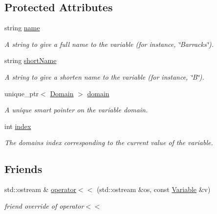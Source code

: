 \subsection*{Protected Attributes}
\begin{DoxyCompactItemize}
\item 
string \hyperlink{classghost_1_1Variable_a05cf4a4cd3a5c033028e0b0f11d1dafd}{name}
\begin{DoxyCompactList}\small\item\em A string to give a full name to the variable (for instance, \char`\"{}\+Barracks\char`\"{}). \end{DoxyCompactList}\item 
string \hyperlink{classghost_1_1Variable_afb5eb79a7f6351b4305fe082699b6d7d}{short\+Name}
\begin{DoxyCompactList}\small\item\em A string to give a shorten name to the variable (for instance, \char`\"{}\+B\char`\"{}). \end{DoxyCompactList}\item 
unique\+\_\+ptr$<$ \hyperlink{classghost_1_1Domain}{Domain} $>$ \hyperlink{classghost_1_1Variable_a9dbda868fa47e4353f30461e89ff8020}{domain}
\begin{DoxyCompactList}\small\item\em A unique smart pointer on the variable domain. \end{DoxyCompactList}\item 
int \hyperlink{classghost_1_1Variable_a934efa463fb1897b4266040e321dbc41}{index}
\begin{DoxyCompactList}\small\item\em The domain\textquotesingle{}s index corresponding to the current value of the variable. \end{DoxyCompactList}\end{DoxyCompactItemize}
\subsection*{Friends}
\begin{DoxyCompactItemize}
\item 
std\+::ostream \& \hyperlink{classghost_1_1Variable_aab05ab0693334e9e9a39f43903a37cb7}{operator$<$$<$} (std\+::ostream \&os, const \hyperlink{classghost_1_1Variable}{Variable} \&v)
\begin{DoxyCompactList}\small\item\em friend override of operator$<$$<$ \end{DoxyCompactList}\end{DoxyCompactItemize}



